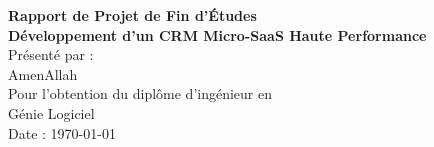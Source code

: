 \documentclass[12pt,a4paper]{report}
\begin{document}
\begin{titlepage}
    \centering
    \vspace*{2cm}
    
    {\Huge \textbf{Rapport de Projet de Fin d'Études}}\\[1cm]
    {\LARGE \textbf{Développement d'un CRM Micro-SaaS Haute Performance}}\\[2cm]
    
    {\Large Présenté par :}\\[0.5cm]
    {\Large AmenAllah}\\[1cm]
    
    {\Large Pour l'obtention du diplôme d'ingénieur en}\\[0.5cm]
    {\Large Génie Logiciel}\\[2cm]
    
    {\Large Date : \today}
    
    \vfill
\end{titlepage}

\setcounter{page}{1}


\clearpage


\clearpage


\clearpage

\tableofcontents
\clearpage

\listoffigures
\clearpage

\listoftables
\clearpage



\clearpage


\clearpage


\clearpage


\clearpage


\clearpage


\clearpage


%

%

%
%
\end{document}
